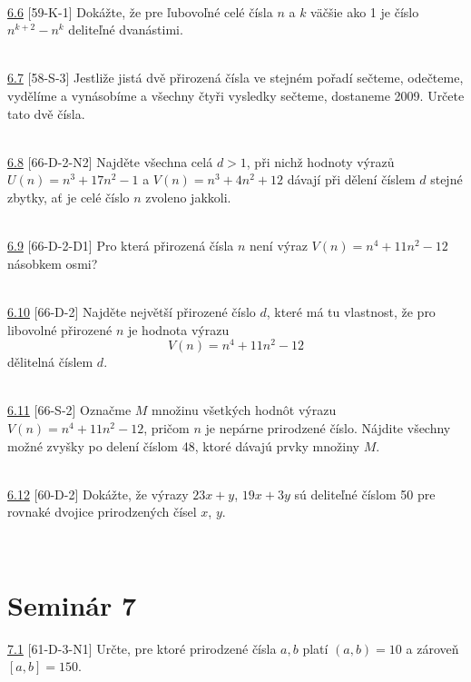 \\

\noindent \ul{6.6} [59-K-1]
Dokážte, že pre ľubovoľné celé čísla $n$ a $k$ väčšie ako 1 je číslo $n^{k+2} - n^k$ deliteľné dvanástimi.


\\

\noindent \ul{6.7} [58-S-3] Jestliže jistá dvě přirozená čísla ve stejném pořadí sečteme, odečteme,
vydělíme a vynásobíme a všechny čtyři vysledky sečteme, dostaneme 2009. Určete tato dvě čísla.

\\

\noindent \ul{6.8} [66-D-2-N2] Najděte všechna celá $d > 1$, při nichž hodnoty výrazů $U(n) = n^3+
17n^2-1$ a $V (n) = n^3+ 4n^2+ 12$ dávají při dělení číslem $d$ stejné zbytky, ať je celé číslo
$n$ zvoleno jakkoli.


\\

\noindent \ul{6.9} [66-D-2-D1] Pro která přirozená čísla $n$ není výraz $V (n) = n^4+ 11n^2 - 12$ násobkem osmi?


\\

\noindent \ul{6.10} [66-D-2]
Najděte největší přirozené číslo $d$, které má tu vlastnost, že pro libovolné přirozené $n$ je hodnota výrazu $$V (n) = n^4+ 11n^2-12$$
dělitelná číslem $d$.


\\

\noindent \ul{6.11} [66-S-2]
Označme $M$ množinu všetkých hodnôt výrazu $V (n) = n^4 + 11n^2 - 12$, pričom $n$ je nepárne prirodzené číslo. Nájdite všechny možné zvyšky po delení číslom 48, ktoré dávajú prvky množiny $M$.


\\

\noindent \ul{6.12} [60-D-2]
Dokážte, že výrazy $23x + y$, $19x + 3y$ sú deliteľné číslom 50 pre rovnaké dvojice prirodzených čísel $x$, $y$.


\\

\section*{Seminár 7}

\noindent \ul{7.1} [61-D-3-N1] Určte, pre ktoré prirodzené čísla $a, b$ platí $(a, b) = 10$ a zároveň  $[a, b] = 150$.


\\

